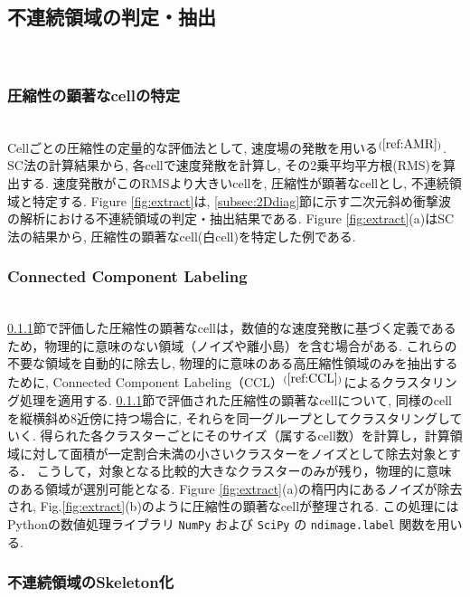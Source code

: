 \documentclass[a4j]{jarticle}
\begin{document}
\subsection{不連続領域の判定・抽出} \label{subsec:discon}
\mbox{}\\[-6.0ex]
\subsubsection{圧縮性の顕著なcellの特定} \label{subsubsec:comp}
\mbox{}\\[-1.0ex]

Cellごとの圧縮性の定量的な評価法として, 速度場の発散を用いる$^{(\ref{ref:AMR})}$.
SC法の計算結果から, 各cellで速度発散を計算し, その2乗平均平方根(RMS)を算出する.
速度発散がこのRMSより大きいcellを, 圧縮性が顕著なcellとし, 不連続領域と特定する.
Figure \ref{fig:extract}は, \ref{subsec:2Ddiag}節に示す二次元斜め衝撃波の解析における不連続領域の判定・抽出結果である.
Figure \ref{fig:extract}(a)はSC法の結果から, 圧縮性の顕著なcell(白cell)を特定した例である.

\subsubsection{Connected Component Labeling}\label{subsubsec:CCL}
\mbox{}\\[-1.0ex]

\ref{subsubsec:comp}節で評価した圧縮性の顕著なcellは，数値的な速度発散に基づく定義であるため，物理的に意味のない領域（ノイズや離小島）を含む場合がある.
これらの不要な領域を自動的に除去し, 物理的に意味のある高圧縮性領域のみを抽出するために, Connected Component Labeling（CCL）$^{(\ref{ref:CCL})}$によるクラスタリング処理を適用する.
\ref{subsubsec:comp}節で評価された圧縮性の顕著なcellについて, 同様のcellを縦横斜め8近傍に持つ場合に, それらを同一グループとしてクラスタリングしていく.
得られた各クラスターごとにそのサイズ（属するcell数）を計算し，計算領域に対して面積が一定割合未満の小さいクラスターをノイズとして除去対象とする．
こうして，対象となる比較的大きなクラスターのみが残り，物理的に意味のある領域が選別可能となる.
Figure \ref{fig:extract}(a)の楕円内にあるノイズが除去され, Fig.\ref{fig:extract}(b)のように圧縮性の顕著なcellが整理される.
この処理にはPythonの数値処理ライブラリ \texttt{NumPy} および \texttt{SciPy} の \texttt{ndimage.label} 関数を用いる.

\subsubsection{不連続領域のSkeleton化} \label{subsubsec:skeleton}
\mbox{}\\[-1.0ex]
\end{document}
